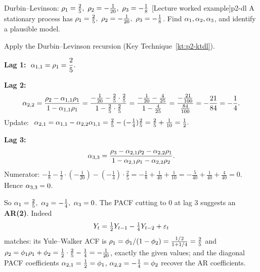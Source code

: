 \begin{exercise}{Durbin--Levinson: $\acf_1=\tfrac25,\ \acf_2=-\tfrac1{20},\ \acf_3=-\tfrac18$ \quad\textnormal{[Lecture worked example]}}{p2-dl}
A stationary process has $\acf_1=\tfrac25,\ \acf_2=-\tfrac1{20},\
\acf_3=-\tfrac18$. Find $\alpha_1,\alpha_2,\alpha_3$, and identify a plausible model.
\end{exercise}
\begin{solution}
Apply the Durbin--Levinson recursion (Key Technique~\ref{kt:p2-ktdl}).

\textbf{Lag 1:} $\ \pacf_{1,1}=\acf_1=\dfrac25 .$

\textbf{Lag 2:}
\[
\alpha_{2,2}=\frac{\rho_2-\alpha_{1,1}\rho_1}{1-\alpha_{1,1}\rho_1}
=\frac{-\frac1{20}-\frac25\cdot\frac25}{1-\frac25\cdot\frac25}
=\frac{-\frac1{20}-\frac4{25}}{1-\frac4{25}}
=\frac{-\frac{21}{100}}{\frac{84}{100}}
=-\frac{21}{84}=-\frac14 .
\]
Update: $\ \pacf_{2,1}=\pacf_{1,1}-\pacf_{2,2}\pacf_{1,1}
=\tfrac25-(-\tfrac14)\tfrac25=\tfrac25+\tfrac1{10}=\tfrac12 .$

\textbf{Lag 3:}
\[
\alpha_{3,3}
=\frac{\rho_3-\alpha_{2,1}\rho_2-\alpha_{2,2}\rho_1}
       {1-\alpha_{2,1}\rho_1-\alpha_{2,2}\rho_2}.
\]
Numerator:
$-\tfrac18-\tfrac12\!\cdot\!(-\tfrac1{20})-(-\tfrac14)\!\cdot\!\tfrac25
=-\tfrac18+\tfrac1{40}+\tfrac1{10}
=-\tfrac{5}{40}+\tfrac{1}{40}+\tfrac{4}{40}=0$.
Hence $\alpha_{3,3}=0$.

So $\pacf_1=\tfrac25,\ \pacf_2=-\tfrac14,\ \pacf_3=0$. The PACF cutting to $0$ at
lag $3$ suggests an \textbf{AR(2)}. Indeed
\[
Y_t=\tfrac12 Y_{t-1}-\tfrac14 Y_{t-2}+\varepsilon_t
\]
matches: its Yule--Walker ACF is
$\rho_1=\phi_1/(1-\phi_2)=\frac{1/2}{1+1/4}=\frac25$
and $\rho_2=\phi_1\rho_1+\phi_2=\frac12\cdot\frac25-\frac14=-\frac1{20}$, exactly
the given values; and the diagonal PACF coefficients
$\alpha_{2,1}=\tfrac12=\phi_1$, $\alpha_{2,2}=-\tfrac14=\phi_2$ recover the AR
coefficients.
\end{solution}


